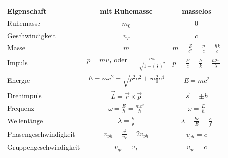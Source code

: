 \documentclass[12pt,a4paper, twoside]{article}
\renewcommand{\=}[1]{\stackrel{#1}{=}}
\theoremstyle{definition}
\theoremstyle{remark}
\begin{document}
\begin{center}
\begin{framed}
	\begin{tabular}{lcc}
	Eigenschaft & mit Ruhemasse & masselos\\
	\midrule
	Ruhemasse & $m_0$ & 0\\
	Geschwindigkeit & $v_T$ & $c$\\
	Masse & $m$ & $m = \frac{E}{c^2} = \frac{p}{c} = \frac{\hbar k}{c}$\\
	Impuls & $p = mv_T$ oder $= \frac{mv}{\sqrt{1-(\frac{v}{c})^2}}$ & $p = \frac{E}{c} = \frac{\hbar}{k} = \frac{\hbar 2\pi}{\lambda}$\\
	Energie & $E = mc^2 = \sqrt{p^2c^2 + m_0^2c^4}$ & $E = mc^2$\\
	Drehimpuls & $\vec L = \vec r \times \vec p$ & $\vec s = \pm h$\\
	Frequenz & $\omega = \frac{E}{\hbar} = \frac{mc^2}{\hbar}$ & $\omega = \frac{E}{\hbar}$\\
	Wellenlänge & $\lambda = \frac{h}{p}$ & $\lambda = \frac{hc}{E} = \frac{c}{f}$\\
	Phasengeschwindigkeit & $v_{ph} = \frac{c^2}{v_T} = 2v_{ph}$ & $v_{ph} = c$\\
	Gruppengeschwindigkeit & $v_{gr} = v_T$ & $v_{gr} = c$
	\end{tabular}
\end{framed}
\end{center}
\end{document}
